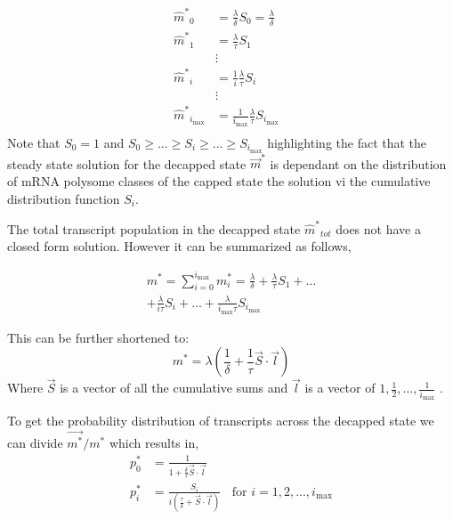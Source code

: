 \documentclass[a4,center,fleqn]{NAR}
\newcommand{\imax}{\ensuremath{{i_{\max}}}\xspace}
\newcommand{\mhat}{\ensuremath{\hat{m}}\xspace}
\newcommand{\mhatstar}{\ensuremath{\mhat^{*}}\xspace}
\newcommand{\mvec}{\ensuremath{\vec{m}}\xspace}
\newcommand{\mvecstar}{\ensuremath{\mvec^*}\xspace}
\newcommand{\msumstar}{\ensuremath{m^*}\xspace}
\begin{document}
\begin{align} \label{eq:decapped_solution} 
\mhatstar_0  &= \frac{\lambda}{\delta}S_{0}=\frac{\lambda}{\delta} \\ \nonumber
\mhatstar_1  &= \frac{\lambda}{\tau}S_{1} \\ \nonumber
& \vdots & \\ \nonumber
\mhatstar_i  &= \frac{1}{i}\frac{\lambda}{\tau}S_{i}  \\ \nonumber
& \vdots & \\ \nonumber
\mhatstar_{\imax}  &= \frac{1}{\imax}\frac{\lambda}{\tau}S_{\imax}  \\ \nonumber
\end{align}
 Note that $S_{0}=1$ and $ S_{0} \ge ... \ge S_{i} \ge ... \ge S_{\imax}$ highlighting the fact that the steady state solution for the decapped state \mvecstar is dependant on the distribution of mRNA polysome classes of the capped state the solution vi the cumulative distribution function $S_i$. %

The total transcript population in the decapped state $\mhatstar_{tot}$ does not have a closed form solution. However it can be summarized as follows,


\begin{align*}
	\msumstar = \sum_{i=0}^{\imax} m_{i}^{*} = \frac{\lambda}{\delta} + \frac{\lambda}{\tau}S_{1}+ \hdots \\
 + \frac{\lambda}{i \tau}S_{i} + \hdots  + \frac{\lambda}{\imax \tau}S_{\imax} 
\end{align*}

This can be further shortened to:
\begin{equation} \label{eq: marked_total_pop}
	\msumstar = \lambda(\frac{1}{\delta} + \frac{1}{\tau}\vec{S} \cdot \vec{l}	) 
\end{equation}
Where $\vec{S}$ is a vector of all the cumulative sums and $\vec{l}$ is a vector of $1,\frac{1}{2},...,\frac{1}{\imax}$ . 


To get the probability distribution of transcripts across the decapped state we can divide $\vec{m^{*}}/\msumstar$ which results in,
\begin{align}\label{eq:decapped_distribution}
	p_{0}^{*} &= \frac{1}{1 + \frac{\delta}{\tau}\vec{S} \cdot \vec{l}}	\\
  	p_{i}^{*} &= \frac{S_{i}}{i(\frac{\tau}{\delta} + \vec{S} \cdot \vec{l})}	\:\:\:\: \text{for } i=1, 2, ..., \imax
\end{align}
\end{document}
